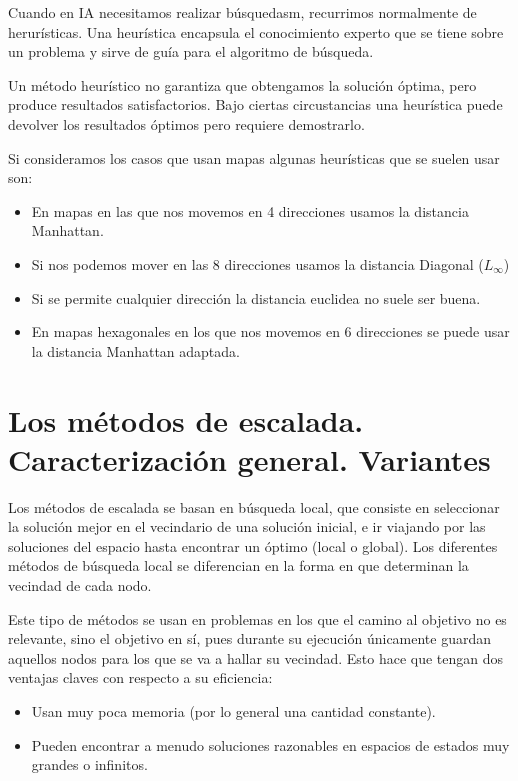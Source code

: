 \documentclass[12pt]{article}
\begin{document}
Cuando en IA necesitamos realizar búsquedasm, recurrimos normalmente
de herurísticas. Una heurística encapsula el conocimiento experto que
se tiene sobre un problema y sirve de guía para el algoritmo de
búsqueda.

Un método heurístico no garantiza que obtengamos la solución óptima,
pero produce resultados satisfactorios. Bajo ciertas circustancias una
heurística puede devolver los resultados óptimos pero requiere
demostrarlo.

Si consideramos los casos que usan mapas algunas heurísticas que se
suelen usar son:

\begin{itemize}
\item En mapas en las que nos movemos en 4 direcciones usamos la
  distancia Manhattan.
\item Si nos podemos mover en las 8 direcciones usamos la distancia Diagonal ($L_\infty$)
\item Si se permite cualquier dirección la distancia euclidea no suele ser buena.
\item En mapas hexagonales en los que nos movemos en 6 direcciones se
  puede usar la distancia Manhattan adaptada.
\end{itemize}


\section{Los métodos de escalada. Caracterización general. Variantes}

Los métodos de escalada se basan en búsqueda local, que consiste en seleccionar 
la solución mejor en el vecindario de una solución inicial, e ir viajando por 
las soluciones del espacio hasta encontrar un óptimo (local o global). Los 
diferentes métodos de búsqueda local se diferencian en la forma en que 
determinan la vecindad de cada nodo. 

Este tipo de métodos se usan en problemas en los que el camino al objetivo no 
es relevante, sino el objetivo en sí, pues durante su ejecución únicamente 
guardan aquellos nodos para los que se va a hallar su vecindad. Esto hace 
que tengan dos ventajas claves con respecto a su eficiencia:
\begin{itemize}
\item Usan muy poca memoria (por lo general una cantidad constante).
\item Pueden encontrar a menudo soluciones razonables en espacios de estados 
  muy grandes o infinitos.
\end{itemize}
\end{document}
